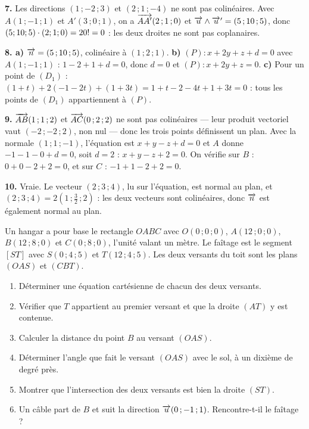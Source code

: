 \begin{corrige}[annales]
\textbf{7.} Les directions $(1\,;-2\,;3)$ et $(2\,;1\,;-4)$ ne sont pas
colinéaires. Avec $A(1\,;-1\,;1)$ et $A'(3\,;0\,;1)$, on a
$\overrightarrow{AA'}(2\,;1\,;0)$ et $\overrightarrow{u} \wedge \overrightarrow{u}' = (5\,;10\,;5)$, donc
$(5;10;5) \cdot (2;1;0) = 20 != 0$ : les deux droites ne sont pas
coplanaires.

\textbf{8. a)} $\overrightarrow{n} = (5\,;10\,;5)$, colinéaire à $(1\,;2\,;1)$.
\textbf{b)} $(P) : x+2y+z+d = 0$ avec $A(1\,;-1\,;1)$ : $1-2+1+d = 0$, donc
$d = 0$ et $(P) : x+2y+z = 0$.
\textbf{c)} Pour un point de $(D_{1})$ :
$(1+t)+2(-1-2t)+(1+3t) = 1+t-2-4t+1+3t = 0$ : tous les points de $(D_{1})$
appartiennent à $(P)$.

\textbf{9.} $\overrightarrow{AB}(1\,;1\,;2)$ et $\overrightarrow{AC}(0\,;2\,;2)$ ne sont pas
colinéaires — leur produit vectoriel vaut $(-2\,;-2\,;2)$, non nul — donc les
trois points définissent un plan. Avec la normale $(1\,;1\,;-1)$, l'équation
est $x+y-z+d = 0$ et $A$ donne $-1-1-0+d = 0$, soit $d = 2$ :
$x+y-z+2 = 0$. On vérifie sur $B$ : $0+0-2+2 = 0$, et sur $C$ :
$-1+1-2+2 = 0$.

\textbf{10.} Vraie. Le vecteur $(2\,;3\,;4)$, lu sur l'équation, est normal
au plan, et $(2\,;3\,;4) = 2\left(1\,;\frac32\,;2\right)$ : les deux vecteurs
sont colinéaires, donc $\overrightarrow{n}$ est également normal au plan.
\end{corrige}

\begin{jecherche}
Un hangar a pour base le rectangle $OABC$ avec $O(0\,;0\,;0)$,
$A(12\,;0\,;0)$, $B(12\,;8\,;0)$ et $C(0\,;8\,;0)$, l'unité valant un mètre.
Le faîtage est le segment $[ST]$ avec $S(0\,;4\,;5)$ et $T(12\,;4\,;5)$. Les
deux versants du toit sont les plans $(OAS)$ et $(CBT)$.

\begin{enumerate}[label=\textbf{\arabic*.}, leftmargin=*, itemsep=0.3em]
  \item Déterminer une équation cartésienne de chacun des deux versants.
  \item Vérifier que $T$ appartient au premier versant et que la droite
        $(AT)$ y est contenue.
  \item Calculer la distance du point $B$ au versant $(OAS)$.
  \item Déterminer l'angle que fait le versant $(OAS)$ avec le sol, à un
        dixième de degré près.
  \item Montrer que l'intersection des deux versants est bien la droite
        $(ST)$.
  \item Un câble part de $B$ et suit la direction $\overrightarrow{u}(0\,;-1\,;1)$.
        Rencontre-t-il le faîtage ?
\end{enumerate}
\end{jecherche}

